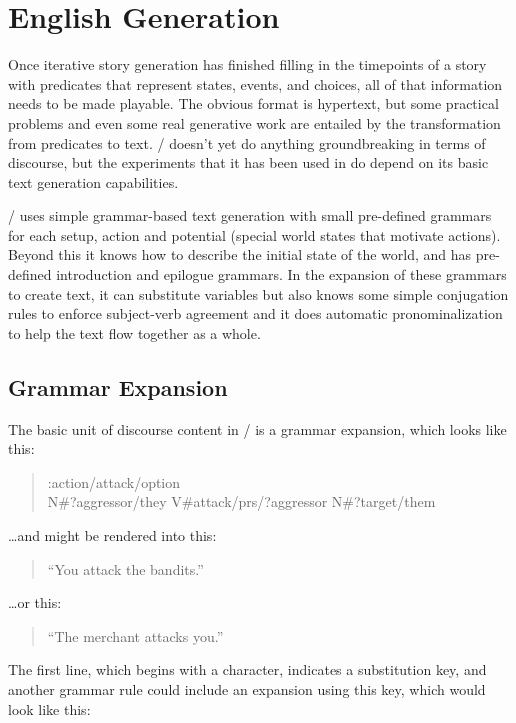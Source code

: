 \section{English Generation}
\label{sec:dunyazad-english}%

Once iterative story generation has finished filling in the timepoints of a story with predicates that represent states, events, and choices, all of that information needs to be made playable.
%
The obvious format is hypertext, but some practical problems and even some real generative work are entailed by the transformation from predicates to text.
%
\dunyazad/ doesn't yet do anything groundbreaking in terms of discourse, but the experiments that it has been used in do depend on its basic text generation capabilities.


\dunyazad/ uses simple grammar-based text generation with small pre-defined grammars for each setup, action and potential (special world states that motivate actions).
%
Beyond this it knows how to describe the initial state of the world, and has pre-defined introduction and epilogue grammars.
%
In the expansion of these grammars to create text, it can substitute variables but also knows some simple conjugation rules to enforce subject-verb agreement and it does automatic pronominalization to help the text flow together as a whole.

\subsection{Grammar Expansion}

The basic unit of discourse content in \dunyazad/ is a grammar expansion, which looks like this:
\begin{quote}
\ttfamily
:action/attack/option \\
N\#?aggressor/they V\#attack/prs/?aggressor N\#?target/them
\end{quote}

\noindent \ldots and might be rendered into this:

\begin{quote}
``You attack the bandits.''
\end{quote}

\noindent \ldots or this:

\begin{quote}
``The merchant attacks you.''
\end{quote}

The first line, which begins with a \exchar{:} character, indicates a substitution key, and another grammar rule could include an expansion using this key, which would look like this:

